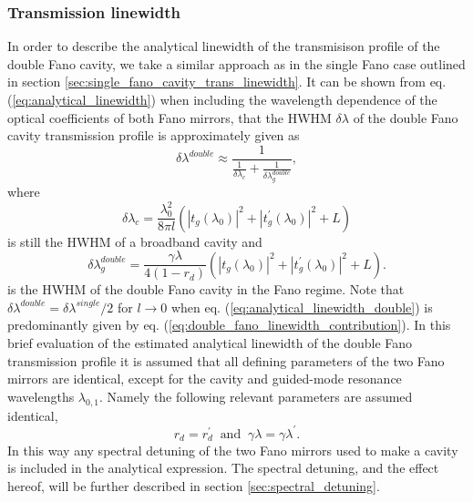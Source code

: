 \subsubsection{Transmission linewidth}\label{sec:double_fano_lw_theory}

In order to describe the analytical linewidth of the transmisison profile of the double Fano cavity, we take a similar approach as in the single Fano case outlined in section \ref{sec:single_fano_cavity_trans_linewidth}. It can be shown from eq. (\ref{eq:analytical_linewidth}) when including the wavelength dependence of the optical coefficients of both Fano mirrors, that the HWHM $\delta \lambda$ of the double Fano cavity transmission profile is approximately given as
\begin{equation}
    \delta \lambda^{double} \approx \frac{1}{\frac{1}{\delta \lambda_c} + \frac{1}{\delta \lambda_g^{double}}},
    \label{eq:analytical_linewidth_double}
\end{equation}
where 
\begin{equation}
    \delta \lambda_c = \frac{\lambda_0^2}{8 \pi l} (|t_g(\lambda_0)|^2 + |t_g^{\prime}(\lambda_0)|^2 + L)
\end{equation}
is still the HWHM of a broadband cavity and
\begin{equation}
    \delta \lambda_g^{double} = \frac{\gamma \lambda}{4 (1-r_d)}(|t_g(\lambda_0)|^2 + |t_g^{\prime}(\lambda_0)|^2 + L).
    \label{eq:double_fano_linewidth_contribution}
\end{equation}
is the HWHM of the double Fano cavity in the Fano regime. Note that $\delta \lambda^{double} = \delta \lambda^{single}/2$ for $l \rightarrow 0$ when eq. (\ref{eq:analytical_linewidth_double}) is predominantly given by eq. (\ref{eq:double_fano_linewidth_contribution}). In this brief evaluation of the estimated analytical linewidth of the double Fano transmission profile it is assumed that all defining parameters of the two Fano mirrors are identical, except for the cavity and guided-mode resonance wavelengths $\lambda_{0,1}$. Namely the following relevant parameters are assumed identical,
\begin{equation}
    r_d = r_d^{\prime} \: \text{ and } \: \gamma \lambda = \gamma \lambda^{\prime}.
\end{equation}
In this way any spectral detuning of the two Fano mirrors used to make a cavity is included in the analytical expression. The spectral detuning, and the effect hereof, will be further described in section \ref{sec:spectral_detuning}.

